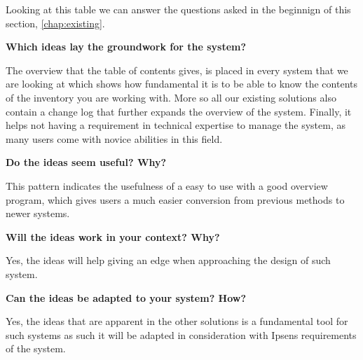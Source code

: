 
Looking at this table we can answer the questions asked in the beginnign of this section, \cref{chap:existing}.

\textbf{Which ideas lay the groundwork for the system?}

The overview that the table of contents gives, is placed in every system that we are looking at which shows how fundamental it is to be able to know the contents of the inventory you are working with.
More so all our existing solutions also contain a change log that further expands the overview of the system. Finally, it helps not having a requirement in technical expertise to manage the system, as many users come with novice abilities in this field.

\textbf{Do the ideas seem useful? Why?}

This pattern indicates the usefulness of a easy to use with a good overview program, which gives users a much easier conversion from previous methods to newer systems.

\textbf{Will the ideas work in your context? Why?}
  
Yes, the ideas will help giving an edge when approaching the design of such system.

\textbf{Can the ideas be adapted to your system? How?}
  
Yes, the ideas that are apparent in the other solutions is a fundamental tool for such systems as such it will be adapted in consideration with Ipsens requirements of the system.

  




